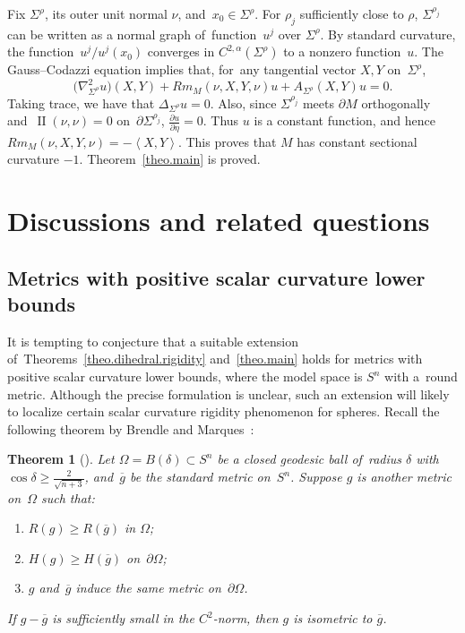 \documentclass[10pt,a4paper]{amsart}
\numberwithin{equation}{section}
\newtheorem{theo}[prop]{Theorem}
\theoremstyle{definition}
\DeclareMathOperator{\secondfund}{II}
\newcommand{\pa}[2]{\frac{\partial #1}{\partial #2}}
\newcommand{\bangle}[1]{\left\langle #1 \right\rangle}
\begin{document}
Fix $\Sigma^\rho$, its outer unit normal $\nu$, and~$x_0\in \Sigma^\rho$. For $\rho_j$ sufficiently close to $\rho$, $\Sigma^{\rho_j}$ can be writ\-ten as a normal graph of~function~$u^j$ over $\Sigma^\rho$. By standard curvature, the function~$u^j/u^j(x_0)$ converges in $C^{2,\alpha}(\Sigma^\rho)$ to a nonzero function~$u$. The Gauss--Codazzi equation implies that, for~any tangential vector $X,Y$ on~$\Sigma^\rho$,
\[
\big(\nabla_{\Sigma^\rho}^2 u\big)(X,Y)+Rm_M(\nu,X,Y,\nu)u + A_{\Sigma^\rho}(X,Y)u=0.
\]
Taking trace, we have that $\Delta_{\Sigma^\rho}u=0$. Also, since $\Sigma^{\rho_j}$ meets $\partial M$ orthogonally and~$\secondfund(\nu,\nu)=0$ on~$\partial\Sigma^{\rho_j}$, $\pa{u}{\eta}=0$. Thus $u$ is a constant function, and hence $Rm_M(\nu,X,Y,\nu)=-\bangle{X,Y}$. This proves that $M$ has constant sectional curvature $-1$. Theorem~\ref{theo.main} is proved.


\section{Discussions and related questions}\label{section4}
\subsection{Metrics with positive scalar curvature lower bounds}
It is tempting to conjecture that a suitable extension of~Theorems~\ref{theo.dihedral.rigidity} and~\ref{theo.main} holds for metrics with positive scalar curvature lower bounds, where the model space is $S^n$ with a~round metric. Although the precise formulation is unclear, such an extension will likely to localize certain scalar curvature rigidity phenomenon for spheres. Recall the following theorem by Brendle and Marques~\cite{BrendleMarques2011scalar}:

\begin{theo}[\cite{BrendleMarques2011scalar}]
Let $\Omega=B(\delta)\subset S^n$ be a closed geodesic ball of~radius $\delta$ with $\cos\delta\ge \frac{2}{\sqrt{n+3}}$, and~$\overline{g}$ be the standard metric on~$S^n$. Suppose $g$ is another metric on~$\Omega$ such that:
\begin{enumerate}\itemsep=0pt
\item[${\rm 1)}$] $R(g)\ge R(\overline{g})$ in $\Omega$;
\item[${\rm 2)}$] $H(g)\ge H(\overline{g})$ on~$\partial \Omega$;
\item[${\rm 3)}$] $g$ and~$\overline{g}$ induce the same metric on~$\partial \Omega$.
\end{enumerate}
If $g-\overline{g}$ is sufficiently small in the $C^2$-norm, then $g$ is isometric to $\overline{g}$.
\end{theo}
\end{document}
